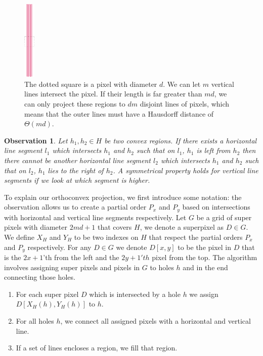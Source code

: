 \documentclass[a4paper, UKenglish]{lipics-v2018}
\newtheorem{observation}{Observation}
\begin{document}
\begin{figure}[H]
\centering
\includegraphics[width=20px]{Figures/linesexample.png}
\caption{The dotted square is a pixel with diameter $d$. We can let $m$ vertical lines intersect the pixel. If their length is far greater than $md$, we can only project these regions to $dm$ disjoint lines of pixels, which means that the outer lines must have a Hausdorff distance of $\Theta(md)$.}
\label{fig:linesexample}
\end{figure}


\begin{observation}
Let $h_1,h_2 \in H$ be two convex regions. If there exists a horizontal line segment $l_1$ which intersects $h_1$ and $h_2$ such that on $l_1$, $h_1$ is left from $h_2$ then there cannot be another horizontal line segment $l_2$ which intersects $h_1$ and $h_2$ such that on $l_2$, $h_1$ lies to the right of $h_2$. A symmetrical property holds for vertical line segments if we look at which segment is higher.
\end{observation}

To explain our orthoconvex projection, we first introduce some notation: the observation allows us to create a partial order $P_x$ and $P_y$ based on intersections with horizontal and vertical line segments respectively. Let $G$ be a grid of super pixels with diameter $2md+1$ that covers $H$, we denote a superpixel as $D \in G$. We define $X_H$ and $Y_H$ to be two indexes on $H$ that respect the partial orders $P_x$ and $P_y$ respectively. For any $D \in G$ we denote $D[x,y]$ to be the pixel in $D$ that is the $2x+1$'th from the left and the $2y+1'th$ pixel from the top. The algorithm involves assigning super pixels and pixels in $G$ to holes $h$ and in the end connecting those holes.

\begin{enumerate}
\item For each super pixel $D$ which is intersected by a hole $h$ we assign $D[X_H(h), Y_H(h)]$ to $h$.
\item For all holes $h$, we connect all assigned pixels with a horizontal and vertical line. 
\item If a set of lines encloses a region, we fill that region.
\end{enumerate}
\end{document}
